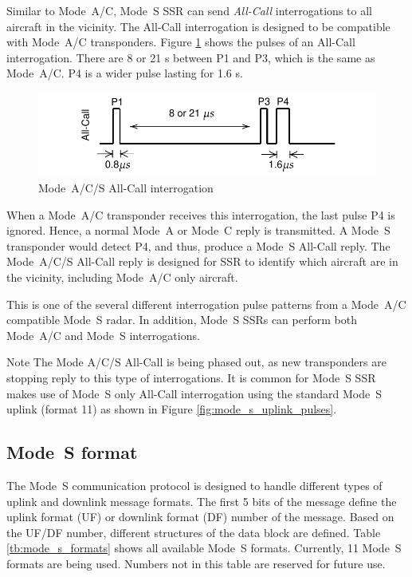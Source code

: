 Similar to Mode~A/C, Mode~S SSR can send \emph{All-Call} interrogations to all aircraft in the vicinity. The All-Call interrogation is designed to be compatible with Mode~A/C transponders. Figure \ref{fig:mode_s_all_call} shows the pulses of an All-Call interrogation. There are 8 or 21 {\textmu}s between P1 and P3, which is the same as Mode~A/C. P4 is a wider pulse lasting for 1.6 {\textmu}s.

\begin{figure}[ht]
  \includegraphics[scale=0.8]{figures/intro/mode_acs_all_call.pdf}
  \caption{Mode~A/C/S All-Call interrogation}
  \label{fig:mode_s_all_call}
\end{figure}

When a Mode~A/C transponder receives this interrogation, the last pulse P4 is ignored. Hence, a normal Mode~A or Mode~C reply is transmitted. A Mode~S transponder would detect P4, and thus, produce a Mode~S All-Call reply. The Mode~A/C/S All-Call reply is designed for SSR to identify which aircraft are in the vicinity, including Mode~A/C only aircraft.

This is one of the several different interrogation pulse patterns from a Mode~A/C compatible Mode~S radar. In addition, Mode~S SSRs can perform both Mode~A/C and Mode~S interrogations. 

\begin{notebox}{Note}
  The Mode A/C/S All-Call is being phased out, as new transponders are stopping reply to this type of interrogations. It is common for Mode~S SSR makes use of Mode~S only All-Call interrogation using the standard Mode~S uplink (format 11) as shown in Figure \ref{fig:mode_s_uplink_pulses}.
\end{notebox}


\subsection{Mode~S format}

The Mode~S communication protocol is designed to handle different types of uplink and downlink message formats. The first 5 bits of the message define the uplink format (UF) or downlink format (DF) number of the message. Based on the UF/DF number, different structures of the data block are defined. Table \ref{tb:mode_s_formats} shows all available Mode~S formats. Currently, 11 Mode~S formats are being used. Numbers not in this table are reserved for future use.

